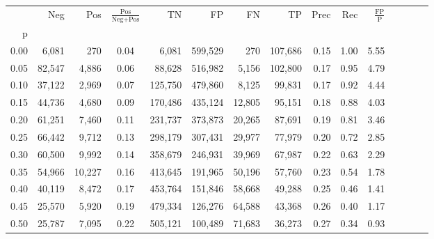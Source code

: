 \begin{tabular}{rrrcrrrrrrrrrrr}
\toprule
{} &     Neg &     Pos & $\frac{\text{Pos}}{\text{Neg}+\text{Pos}}$ &       TN &       FP &       FN &       TP &  Prec &   Rec & $\frac{\text{FP}}{\text{P}}$ \\
p    &         &         &                                            &          &          &          &          &       &       &                              \\
\midrule
0.00 &   6,081 &     270 &                                       0.04 &    6,081 &  599,529 &      270 &  107,686 &  0.15 &  1.00 &                         5.55 \\
0.05 &  82,547 &   4,886 &                                       0.06 &   88,628 &  516,982 &    5,156 &  102,800 &  0.17 &  0.95 &                         4.79 \\
0.10 &  37,122 &   2,969 &                                       0.07 &  125,750 &  479,860 &    8,125 &   99,831 &  0.17 &  0.92 &                         4.44 \\
0.15 &  44,736 &   4,680 &                                       0.09 &  170,486 &  435,124 &   12,805 &   95,151 &  0.18 &  0.88 &                         4.03 \\
0.20 &  61,251 &   7,460 &                                       0.11 &  231,737 &  373,873 &   20,265 &   87,691 &  0.19 &  0.81 &                         3.46 \\
0.25 &  66,442 &   9,712 &                                       0.13 &  298,179 &  307,431 &   29,977 &   77,979 &  0.20 &  0.72 &                         2.85 \\
0.30 &  60,500 &   9,992 &                                       0.14 &  358,679 &  246,931 &   39,969 &   67,987 &  0.22 &  0.63 &                         2.29 \\
0.35 &  54,966 &  10,227 &                                       0.16 &  413,645 &  191,965 &   50,196 &   57,760 &  0.23 &  0.54 &                         1.78 \\
0.40 &  40,119 &   8,472 &                                       0.17 &  453,764 &  151,846 &   58,668 &   49,288 &  0.25 &  0.46 &                         1.41 \\
0.45 &  25,570 &   5,920 &                                       0.19 &  479,334 &  126,276 &   64,588 &   43,368 &  0.26 &  0.40 &                         1.17 \\
0.50 &  25,787 &   7,095 &                                       0.22 &  505,121 &  100,489 &   71,683 &   36,273 &  0.27 &  0.34 &                         0.93 \\

\end{tabular}
